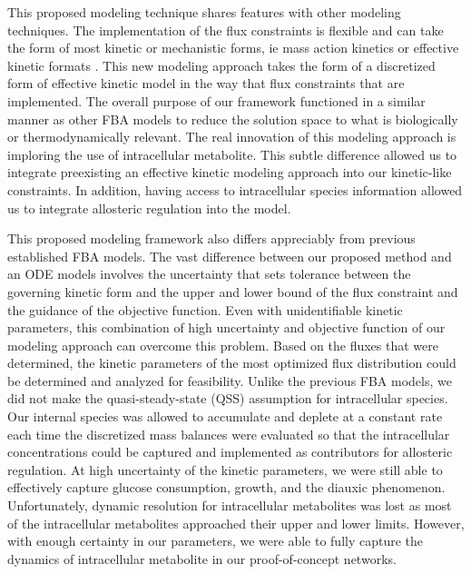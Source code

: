 \documentclass[12pt]{article}
\begin{document}
This proposed modeling technique shares features with other modeling techniques. The implementation of the flux constraints is flexible and can take the form of most kinetic or mechanistic forms, ie mass action kinetics or effective kinetic formats \cite{heijnen2005approximative}. This new modeling approach takes the form of a discretized form of effective kinetic model in the way that flux constraints that are implemented. The overall purpose of our framework functioned in a similar manner as other FBA models to reduce the solution space to what is biologically or thermodynamically relevant. The real innovation of this modeling approach is imploring the use of intracellular metabolite. This subtle difference allowed us to integrate preexisting an effective kinetic modeling approach \cite{wayman2015dynamic,sagar2015dynamic} into our kinetic-like constraints. In addition, having access to intracellular species information allowed us to integrate allosteric regulation into the model. 

This proposed modeling framework also differs appreciably from previous established FBA models. The vast difference between our proposed method and an ODE models involves the uncertainty that sets tolerance between the governing kinetic form and the upper and lower bound of the flux constraint and the guidance of the objective function. Even with unidentifiable kinetic parameters, this combination of high uncertainty and objective function of our modeling approach can overcome this problem. Based on the fluxes that were determined, the kinetic parameters of the most optimized flux distribution could be determined and analyzed for feasibility. Unlike the previous FBA models, we did not make the quasi-steady-state (QSS) assumption for intracellular species. Our internal species was allowed to accumulate and deplete at a constant rate each time the discretized mass balances were evaluated so that the intracellular concentrations could be captured and implemented as contributors for allosteric regulation. At high uncertainty of the kinetic parameters, we were still able to effectively capture glucose consumption, growth, and the diauxic phenomenon. Unfortunately, dynamic resolution for intracellular metabolites was lost as most of the intracellular metabolites approached their upper and lower limits. However, with enough certainty in our parameters, we were able to fully capture the dynamics of intracellular metabolite in our proof-of-concept networks. 
\end{document}
